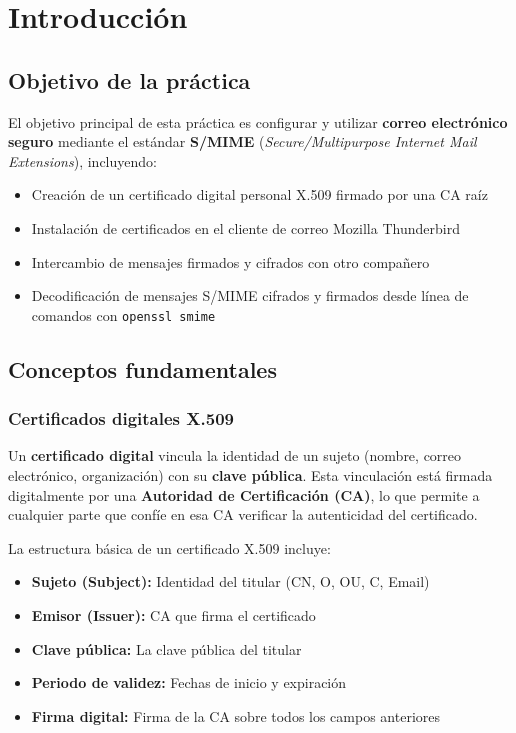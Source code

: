 \chapter{Introducción}

\section{Objetivo de la práctica}

El objetivo principal de esta práctica es configurar y utilizar \textbf{correo electrónico seguro} mediante el estándar \textbf{S/MIME} (\textit{Secure/Multipurpose Internet Mail Extensions}), incluyendo:

\begin{itemize}[label=\textbullet]
    \item Creación de un certificado digital personal X.509 firmado por una CA raíz
    \item Instalación de certificados en el cliente de correo Mozilla Thunderbird
    \item Intercambio de mensajes firmados y cifrados con otro compañero
    \item Decodificación de mensajes S/MIME cifrados y firmados desde línea de comandos con \texttt{openssl smime}
\end{itemize}

\section{Conceptos fundamentales}

\subsection{Certificados digitales X.509}

Un \textbf{certificado digital} vincula la identidad de un sujeto (nombre, correo electrónico, organización) con su \textbf{clave pública}. Esta vinculación está firmada digitalmente por una \textbf{Autoridad de Certificación (CA)}, lo que permite a cualquier parte que confíe en esa CA verificar la autenticidad del certificado.

La estructura básica de un certificado X.509 incluye:

\begin{itemize}[label=\textbullet]
    \item \textbf{Sujeto (Subject):} Identidad del titular (CN, O, OU, C, Email)
    \item \textbf{Emisor (Issuer):} CA que firma el certificado
    \item \textbf{Clave pública:} La clave pública del titular
    \item \textbf{Periodo de validez:} Fechas de inicio y expiración
    \item \textbf{Firma digital:} Firma de la CA sobre todos los campos anteriores
\end{itemize}

